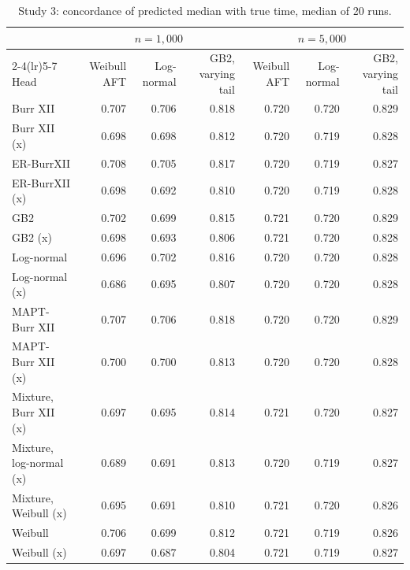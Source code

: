 \begin{table}[htbp]
\centering
\caption{Study 3: concordance of predicted median with true time, median of 20 runs.}\label{stab:network_c}
\scriptsize
\begin{tabular}{lrrrrrr}
\toprule
& \multicolumn{3}{c}{$n = 1{,}000$} & \multicolumn{3}{c}{$n = 5{,}000$} \\
\cmidrule(lr){2-4}\cmidrule(lr){5-7}
Head & Weibull AFT & Log-normal & GB2, varying tail & Weibull AFT & Log-normal & GB2, varying tail \\
\midrule
Burr XII & 0.707 & 0.706 & 0.818 & 0.720 & 0.720 & 0.829 \\
Burr XII (x) & 0.698 & 0.698 & 0.812 & 0.720 & 0.719 & 0.828 \\
ER-BurrXII & 0.708 & 0.705 & 0.817 & 0.720 & 0.719 & 0.827 \\
ER-BurrXII (x) & 0.698 & 0.692 & 0.810 & 0.720 & 0.719 & 0.828 \\
GB2 & 0.702 & 0.699 & 0.815 & 0.721 & 0.720 & 0.829 \\
GB2 (x) & 0.698 & 0.693 & 0.806 & 0.721 & 0.720 & 0.828 \\
Log-normal & 0.696 & 0.702 & 0.816 & 0.720 & 0.720 & 0.828 \\
Log-normal (x) & 0.686 & 0.695 & 0.807 & 0.720 & 0.720 & 0.828 \\
MAPT-Burr XII & 0.707 & 0.706 & 0.818 & 0.720 & 0.720 & 0.829 \\
MAPT-Burr XII (x) & 0.700 & 0.700 & 0.813 & 0.720 & 0.720 & 0.828 \\
Mixture, Burr XII (x) & 0.697 & 0.695 & 0.814 & 0.721 & 0.720 & 0.827 \\
Mixture, log-normal (x) & 0.689 & 0.691 & 0.813 & 0.720 & 0.719 & 0.827 \\
Mixture, Weibull (x) & 0.695 & 0.691 & 0.810 & 0.721 & 0.720 & 0.826 \\
Weibull & 0.706 & 0.699 & 0.812 & 0.721 & 0.719 & 0.826 \\
Weibull (x) & 0.697 & 0.687 & 0.804 & 0.721 & 0.719 & 0.827 \\
\bottomrule
\end{tabular}

\par\vspace{0.3em}{\footnotesize (x): shape parameters predicted per patient.}
\end{table}
